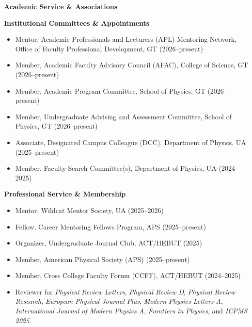 \documentclass[11pt]{article}
\begin{document}
\medskip

{\Large\textbf{Academic Service \& Associations}}

{\large\textbf{Institutional Committees \& Appointments}}

\begin{itemize}[leftmargin=*,nosep]
    \item Mentor, Academic Professionals and Lecturers (APL) Mentoring Network, Office of Faculty Professional Development, GT (2026--present)
    \item Member, Academic Faculty Advisory Council (AFAC), College of Science, GT (2026--present)
    \item Member, Academic Program Committee, School of Physics, GT (2026--present)
    \item Member, Undergraduate Advising and Assessment Committee, School of Physics, GT (2026--present)
    \item Associate, Designated Campus Colleague (DCC), Department of Physics, UA (2025--present)
    \item Member, Faculty Search Committee(s), Department of Physics, UA (2024--2025)
\end{itemize}

{\large\textbf{Professional Service \& Membership}}

\begin{itemize}[leftmargin=*,nosep]
    \item Mentor, Wildcat Mentor Society, UA (2025--2026)
    \item Fellow, Career Mentoring Fellows Program, APS (2025--present)
    \item Organizer, Undergraduate Journal Club, ACT\slash HEBUT (2025)
    \item Member, American Physical Society (APS) (2025--present)
    \item Member, Cross College Faculty Forum (CCFF), ACT\slash HEBUT (2024--2025)
    \item Reviewer for \textit{Physical Review Letters}, \textit{Physical Review D}, \textit{Physical Review Research}, \textit{European Physical Journal Plus}, \textit{Modern Physics Letters A}, \textit{International Journal of Modern Physics A}, \textit{Frontiers in Physics}, and \textit{ICPMS 2025}.
\end{itemize}
\end{document}
